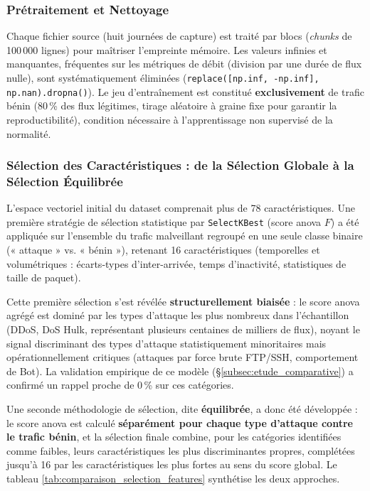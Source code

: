 \subsubsection{Prétraitement et Nettoyage}
Chaque fichier source (huit journées de capture) est traité par blocs (\textit{chunks} de 100\,000 lignes) pour maîtriser l'empreinte mémoire. Les valeurs infinies et manquantes, fréquentes sur les métriques de débit (division par une durée de flux nulle), sont systématiquement éliminées (\texttt{replace([np.inf, -np.inf], np.nan).dropna()}). Le jeu d'entraînement est constitué \textbf{exclusivement} de trafic bénin (80\,\% des flux légitimes, tirage aléatoire à graine fixe pour garantir la reproductibilité), condition nécessaire à l'apprentissage non supervisé de la normalité.

\subsubsection{Sélection des Caractéristiques : de la Sélection Globale à la Sélection Équilibrée}
L'espace vectoriel initial du dataset comprenait plus de 78 caractéristiques. Une première stratégie de sélection statistique par \texttt{SelectKBest} (score \acrshort{anova} $F$) a été appliquée sur l'ensemble du trafic malveillant regroupé en une seule classe binaire (« attaque » vs. « bénin »), retenant 16 caractéristiques (temporelles et volumétriques : écarts-types d'inter-arrivée, temps d'inactivité, statistiques de taille de paquet).

Cette première sélection s'est révélée \textbf{structurellement biaisée} : le score \acrshort{anova} agrégé est dominé par les types d'attaque les plus nombreux dans l'échantillon (DDoS, DoS Hulk, représentant plusieurs centaines de milliers de flux), noyant le signal discriminant des types d'attaque statistiquement minoritaires mais opérationnellement critiques (attaques par force brute FTP/SSH, comportement de Bot). La validation empirique de ce modèle (\S\ref{subsec:etude_comparative}) a confirmé un rappel proche de 0\,\% sur ces catégories.

Une seconde méthodologie de sélection, dite \textbf{équilibrée}, a donc été développée : le score \acrshort{anova} est calculé \textbf{séparément pour chaque type d'attaque contre le trafic bénin}, et la sélection finale combine, pour les catégories identifiées comme faibles, leurs caractéristiques les plus discriminantes propres, complétées jusqu'à 16 par les caractéristiques les plus fortes au sens du score global. Le tableau \ref{tab:comparaison_selection_features} synthétise les deux approches.

